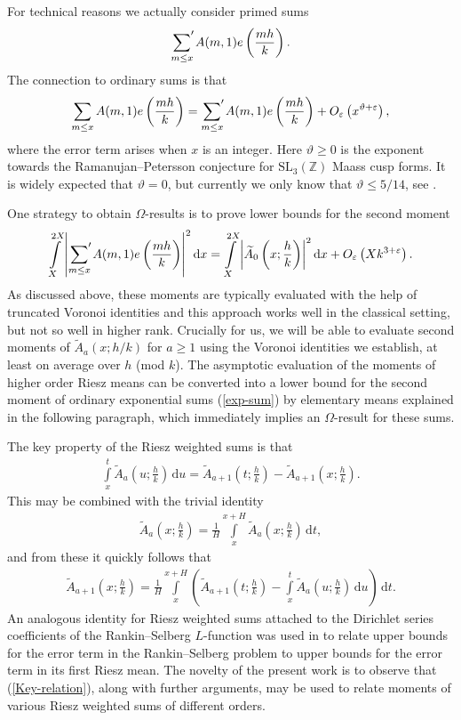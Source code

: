 \documentclass[a4paper,10pt,twoside]{amsart}
\theoremstyle{definition}
\numberwithin{equation}{section}
\newcommand\eps{\varepsilon}
\renewcommand\:{\colon}
\newcommand{\sump}{\mathop{{\sum}^{\raisebox{-3pt}{\makebox[0pt][l]{$'$}}}}}
\begin{document}
For technical reasons we actually consider primed sums
\[ 
\sump_{m\leq x}A(m,1)e\left(\frac{mh}k\right).\]
The connection to ordinary sums is that 
\[ 
\sum_{m\leq x}A(m,1)e\left(\frac{mh}k\right)=\sump_{m\leq x}A(m,1)e\left(\frac{mh}k\right)+O_\eps\left(x^{\vartheta+\varepsilon}\right),
\]
where the error term arises when $x$ is an integer. Here $\vartheta\geqslant 0$ is the exponent towards the Ramanujan--Petersson conjecture for $\mathrm{SL}_3(\mathbb Z)$ Maass cusp forms. It is widely expected that $\vartheta=0$, but currently we only know that $\vartheta\leqslant 5/14$, see \cite[Appendix 2]{Kim--Sarnak}.

One strategy to obtain $\Omega$-results is to prove lower bounds for the second moment   
\begin{align}\label{exp-sum}
\int\limits_X^{2X}\left|\sump_{m\leq x}A(m,1)e\left(\frac{mh}k\right)\right|^2 \mathrm d x=\int\limits_X^{2X}\left|\widetilde A_0\left(x;\frac hk\right)\right|^2 \mathrm d x+O_\varepsilon\left(Xk^{3+\varepsilon}\right).
\end{align}
As discussed above, these moments are typically evaluated with the help of truncated Voronoi identities and this approach works well in the classical setting, but not so well in higher rank. Crucially for us, we will be able to evaluate second moments of $\widetilde A_a(x;h/k)$ for $a\geq 1$ using the Voronoi identities we establish, at least on average over $h$ (mod $k$). The asymptotic evaluation of the moments of higher order Riesz means can be converted into a lower bound for the second moment of ordinary exponential sums (\ref{exp-sum}) by elementary means explained in the following paragraph, which immediately implies an $\Omega$-result for these sums. 

The key property of the Riesz weighted sums is that 
\begin{align}\label{Key-property}
\int\limits_x^t \widetilde A_a\left(u;\frac hk\right)\,\mathrm d u=\widetilde A_{a+1}\left(t;\frac hk\right)-\widetilde A_{a+1}\left(x;\frac hk\right). 
\end{align}
This may be combined with the trivial identity
\begin{align*}
\widetilde A_a\left(x;\frac hk\right)=\frac1H\int\limits_x^{x+H}\widetilde A_a\left(x;\frac hk\right)\,\mathrm d t,
\end{align*}
and from these it quickly follows that 
\begin{align}\label{Key-relation}
\widetilde A_{a+1}\left(x;\frac hk\right)=\frac1H\int\limits_x^{x+H}\left( \widetilde A_{a+1}\left(t;\frac hk\right)-\int\limits_x^t\widetilde A_a\left(u;\frac hk\right)\,\mathrm d u\right)\,\mathrm d t.
\end{align}
An analogous identity for Riesz weighted sums attached to the Dirichlet series coefficients of the Rankin--Selberg $L$-function was used in \cite{Ivic--Matsumoto--Tanigawa} to relate upper bounds for the error term in the Rankin--Selberg problem to upper bounds for the error term in its first Riesz mean. The novelty of the present work is to observe that (\ref{Key-relation}), along with further arguments, may be used to relate moments of various Riesz weighted sums of different orders.
 
\end{document}
